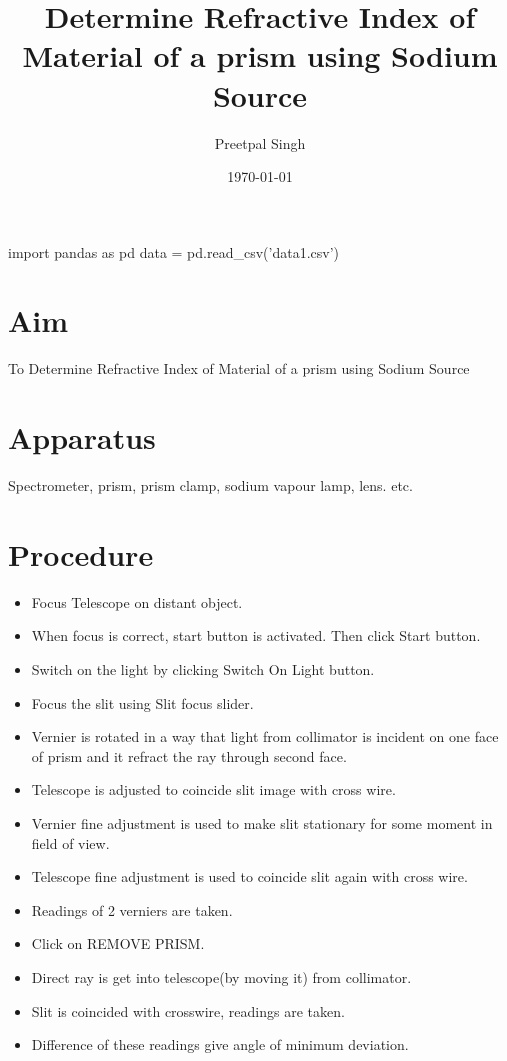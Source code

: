 \documentclass{article}
\title{Determine Refractive Index of Material of a prism using Sodium Source}
\author{Preetpal Singh}
\date{\today}
\begin{document}
    \maketitle
\begin{pycode}
import pandas as pd
data = pd.read_csv('data1.csv')
	
\end{pycode}
\section{Aim}
To Determine Refractive Index of Material of a prism using Sodium Source
\section{Apparatus}
Spectrometer, prism, prism clamp, sodium vapour lamp, lens. etc.
\section{Procedure}
\begin{itemize}
    \item Focus Telescope on distant object.
    \item When focus is correct, start button is activated. Then click Start button.
    \item Switch on the light by clicking Switch On Light button.
    \item Focus the slit using Slit focus slider.
    \item Vernier is rotated in a way that light from collimator is incident on one face of prism and it refract the ray through second face.
    \item Telescope is adjusted to coincide slit image with cross wire.
    \item Vernier fine adjustment is used to make slit stationary for some moment in field of view.
    \item Telescope fine adjustment is used to coincide slit again with cross wire.
    \item Readings of 2 verniers are taken.
    \item Click on REMOVE PRISM.
    \item Direct ray is get into telescope(by moving it) from collimator.
    \item Slit is coincided with crosswire, readings are taken.
    \item Difference of these readings give angle of minimum deviation.
\end{itemize}
\end{document}
